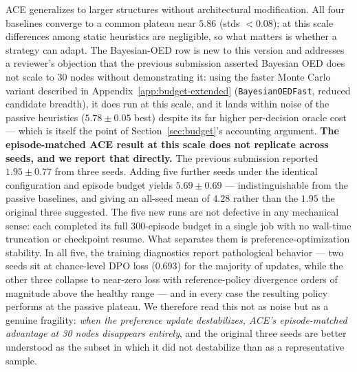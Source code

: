 \documentclass{article}
\theoremstyle{plain}
\theoremstyle{definition}
\theoremstyle{remark}
\begin{document}
ACE generalizes to larger structures without architectural modification. All four baselines converge to a common plateau near $5.86$ (stds $<\!0.08$); at this scale differences among static heuristics are negligible, so what matters is whether a strategy can adapt. The Bayesian-OED row is new to this version and addresses a reviewer's objection that the previous submission asserted Bayesian OED does not scale to 30 nodes without demonstrating it: using the faster Monte Carlo variant described in Appendix~\ref{app:budget-extended} (\texttt{BayesianOEDFast}, reduced candidate breadth), it does run at this scale, and it lands within noise of the passive heuristics ($5.78\pm0.05$ best) despite its far higher per-decision oracle cost --- which is itself the point of Section~\ref{sec:budget}'s accounting argument. \textbf{The episode-matched ACE result at this scale does not replicate across seeds, and we report that directly.} The previous submission reported $1.95\pm0.77$ from three seeds. Adding five further seeds under the identical configuration and episode budget yields $5.69\pm0.69$ --- indistinguishable from the passive baselines, and giving an all-seed mean of $4.28$ rather than the $1.95$ the original three suggested. The five new runs are not defective in any mechanical sense: each completed its full 300-episode budget in a single job with no wall-time truncation or checkpoint resume. What separates them is preference-optimization stability. In all five, the training diagnostics report pathological behavior --- two seeds sit at chance-level DPO loss ($0.693$) for the majority of updates, while the other three collapse to near-zero loss with reference-policy divergence orders of magnitude above the healthy range --- and in every case the resulting policy performs at the passive plateau. We therefore read this not as noise but as a genuine fragility: \emph{when the preference update destabilizes, ACE's episode-matched advantage at 30 nodes disappears entirely}, and the original three seeds are better understood as the subset in which it did not destabilize than as a representative sample.
\end{document}
